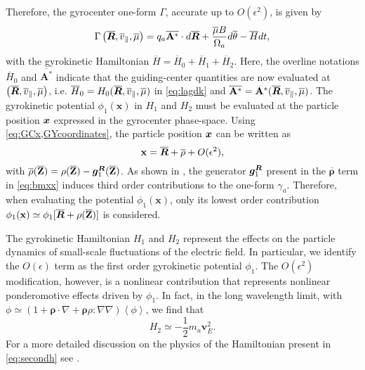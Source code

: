 Therefore, the gyrocenter one-form ${\Gamma}$, accurate up to $O(\epsilon^2)$, is given by 
%
\begin{equation} \label{GYGamma}
{\Gamma}\left( \overline{\bm{R}}, \overline{v}_{\parallel} , \overline{\mu}\right)  = q_a \overline{\mathbf A^*} \cdot d \overline{\bm{R}} + \frac{\overline{\mu} B}{\Omega_a } d \overline{ \theta} - \overline{H}  d t,
\end{equation}
%
with the gyrokinetic Hamiltonian $\overline{H} = \overline{H}_0 + \overline{H}_1+\overline{H}_2$.
%
Here, the overline notations $\overline{H}_0$ and $\overline{\mathbf A^*}$ indicate that the guiding-center quantities are now evaluated at $\left( \overline{\bm{R}}, \overline{v}_{\parallel} , \overline{\mu} \right)$, i.e. $ \overline{H}_0 = H_0(\overline{\bm{R}}, \overline{v}_{\parallel},\overline{\mu})$ in \cref{eq:lagdk} and $\overline{\mathbf A^*} = \mathbf A^*(\overline{\bm{R}}, \overline{v}_{\parallel},\overline{\mu})$.
%
The gyrokinetic potential $\phi_1(\mathbf x)$ in $H_1$ and $H_2$ must be evaluated at the particle position $\bm{x}$ expressed in the gyrocenter phase-space. 
%
Using \cref{eq:GCx,GYcoordinates}, the particle position $\bm{x}$ can be written as
%
\begin{equation}
    \mathbf x = \overline{\bm{R}}+\overline{\mathbf{\rho}}+O(\epsilon^2),
\label{eq:bmxx}
\end{equation}
%
with $\overline{\mathbf{\rho}}(\overline{\mathbf Z})=\mathbf \rho (\overline{\mathbf Z}) - \bm{g}^{\bm{R}}_1(\overline{\mathbf Z})$.
%
As shown in \citet{Brizard1989,Sugama2000}, the generator $\bm{g}^{\bm{R}}_1$ present in the $\overline{\mathbf{\rho}}$ term in \cref{eq:bmxx} induces third order contributions to the one-form $\gamma_a$.
%
Therefore, when evaluating the potential $\phi_1(\mathbf x)$, only its lowest order contribution $\phi_1(\mathbf x)\simeq \phi_1[\overline{\bm{R}}+\mathbf \rho(\overline{\mathbf Z})]$ is considered.

The gyrokinetic Hamiltonian $H_1$ and $H_2$ represent the effects on the particle dynamics of small-scale fluctuations of the electric field.
%
In particular, we identify the $O(\epsilon)$ term as the first order gyrokinetic potential $\phi_1$.
%
The $O(\epsilon^2)$ modification, however, is a nonlinear contribution that represents nonlinear ponderomotive effects driven by $\phi_1$.
%
In fact, in the long wavelength limit, with $\phi \simeq (1+\mathbf \rho \cdot \nabla + \mathbf \rho \rho :\nabla \nabla)\left<\phi\right>$, we find that
%
\begin{equation}
    H_2 \simeq -\frac{1}{2}m_a \mathbf v_E^2.
\label{eq:secondh}
\end{equation}
%
For a more detailed discussion on the physics of the Hamiltonian present in \cref{eq:secondh} see \citet{Krommes2013}.

